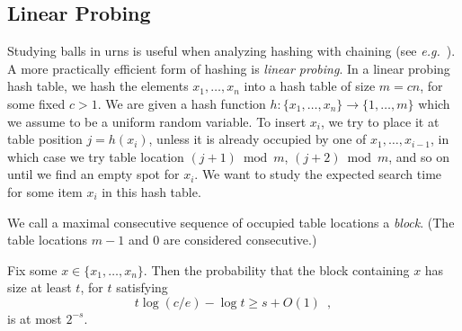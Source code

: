 \documentclass{patmorin}
\begin{document}
\subsection{Linear Probing}

Studying balls in urns is useful when analyzing hashing with
chaining (see \emph{e.g.}~\cite[Section~5.1]{morin:open}). A more
practically efficient form of hashing is \emph{linear probing}.  In a
linear probing hash table, we hash the elements $x_1, \ldots, x_n$
into a hash table of size $m=cn$, for some fixed $c> 1$. We are given
a hash function $h : \{x_1, \ldots, x_n\} \to \{1, \ldots, m\}$ which
we assume to be a uniform random variable. To insert $x_i$, we try to
place it at table position $j=h(x_i)$, unless it is already occupied
by one of $x_1,\ldots,x_{i-1}$, in which case we try table location
$(j+1)\bmod m$, $(j+2)\bmod m$, and so on until we find an empty spot
for $x_i$.  We want to study the expected search time for some item
$x_i$ in this hash table.

We call a maximal consecutive sequence of occupied table locations a
\emph{block}. (The table locations $m-1$ and $0$ are considered
consecutive.)

\begin{thm}
  Fix some $x\in\{x_1,\ldots,x_n\}$. Then the probability that the
  block containing $x$ has size at least $t$, for $t$ satisfying
  \[
    t \log (c/e) - \log t \ge s + O(1) \enspace ,
  \]
  is at most $2^{-s}$.
\end{thm}
\end{document}
